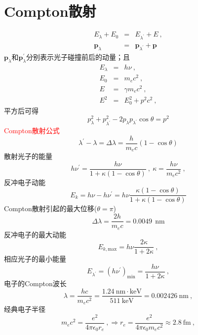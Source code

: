 \documentclass[11pt,a4paper]{article}
\renewcommand{\vec}[1]{\boldsymbol{#1}}
\begin{document}
\section{Compton散射}
\begin{eqnarray}
\nonumber E_{\lambda} + E_0 &=& E_{\lambda^{\prime}} +E ~, \\
\vec{p}_{\lambda} &=& \vec{p}_{\lambda^{\prime}} +\vec{p}
\end{eqnarray}
$\vec{p}_{\lambda}$和$\vec{p}_{\lambda}^{\prime}$分别表示光子碰撞前后的动量；且
\begin{eqnarray}
\nonumber E_{\lambda} &=& h\nu ~, \\
\nonumber E_0 &=& m_e c^2 ~, \\
\nonumber E &=& \gamma m_{e} c^2 ~, \\
E^2 &=& E_0^2 +p^2c^2 ~, 
\end{eqnarray}
平方后可得
\begin{equation}
p_{\lambda}^2 +p_{\lambda^{\prime}}^2 -2 p_{\lambda} p_{\lambda^{\prime}} \cos \theta = p^2
\end{equation}
\textcolor{red}{Compton散射公式}
\begin{equation}
\lambda^{\prime} -\lambda = \Delta \lambda = \frac{h}{m_e c} (1-\cos \theta)
\end{equation}
散射光子的能量
\begin{equation}
h\nu^{\prime} = \frac{h\nu}{1+\kappa (1-\cos \theta)} ~, ~\kappa = \frac{h\nu}{m_e c^2} ~, 
\end{equation}
反冲电子动能
\begin{equation}
E_k = h\nu -h\nu^{\prime} = h\nu \frac{\kappa(1-\cos \theta)}{1+\kappa (1-\cos \theta)}
\end{equation}
Compton散射引起的最大位移($\theta = \pi$)
\begin{equation}
\Delta \lambda = \frac{2h}{m_e c}  = 0.0049 ~~\text{nm}
\end{equation}
反冲电子的最大动能
\begin{equation}
E_{k, \text{max}} = h\nu \frac{2\kappa}{1+2\kappa} ~,
\end{equation}
相应光子的最小能量
\begin{equation}
E_{\lambda^{\prime}} = (h\nu^{\prime})_{\text{min}} = \frac{h\nu}{1+2\kappa} ~,
\end{equation}
电子的Compton波长
\begin{equation}
\lambda = \frac{hc}{m_e c^2} = \frac{1.24 ~\text{nm}\cdot \text{keV}}{511 ~\text{keV}} = 0.002426 ~\text{nm} ~,
\end{equation}
经典电子半径
\begin{equation}
m_e c^2 = \frac{e^2}{4\pi \epsilon_0 r_e} ~, \Longrightarrow r_e = \frac{e^2}{4\pi \epsilon_0 m_e c^2} \approx 2.8 ~\text{fm} ~,
\end{equation}
\end{document}
